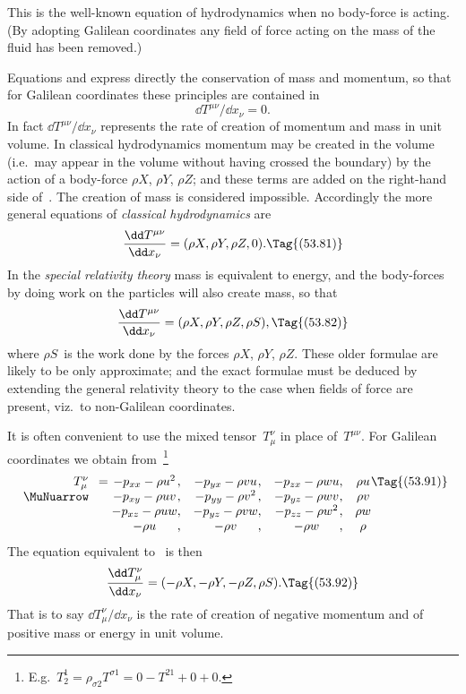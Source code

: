 \documentclass[12pt]{book}
\begin{document}
This is the well-known equation of hydrodynamics when no body\hyp{}force is
%
acting. (By adopting Galilean coordinates any field of force acting on the
mass of the fluid has been removed.)

Equations  and  express directly the conservation of mass
and momentum, so that for Galilean coordinates these principles are contained
%
in
\[
\dd T^{\mu\nu}/\dd x_{\nu} = 0.
\]
In fact $\dd T^{\mu\nu}/\dd x_{\nu}$ represents the rate of creation of momentum and mass in
unit volume. In classical hydrodynamics momentum may be created in the
volume (i.e.\ may appear in the volume without having crossed the boundary)
by the action of a body\hyp{}force $\rho X$, $\rho Y$, $\rho Z$; and these terms are added on the
right-hand side of~. The creation of mass is considered impossible.
Accordingly the more general equations of \emph{classical hydrodynamics} are
\[
\frac{\dd T^{\mu\nu}}{\dd x_{\nu}} = (\rho X, \rho Y, \rho Z, 0).
\Tag{(53.81)}
\]
In the \emph{special relativity theory} mass is equivalent to energy, and the body\hyp{}forces
by doing work on the particles will also create mass, so that
\[
\frac{\dd T^{\mu\nu}}{\dd x_{\nu}} = (\rho X, \rho Y, \rho Z, \rho S),
\Tag{(53.82)}
\]
where $\rho S$~is the work done by the forces $\rho X$, $\rho Y$, $\rho Z$. These older formulae
are likely to be only approximate; and the exact formulae must be deduced
by extending the general relativity theory to the case when fields of force are
present, viz.\ to non\hyp{}Galilean coordinates.

It is often convenient to use the mixed tensor~$T_{\mu}^{\nu}$ in place of~$T^{\mu\nu}$. For
Galilean coordinates we obtain from~\footnote
  {E.g.\ $T_{2}^{1} = \rho_{\sigma 2} T^{\sigma 1} = 0 - T^{21} + 0 + 0$.}
\[
\begin{array}[t]{r}
  T_{\mu}^{\nu} \\
  \MuNuarrow
\end{array}
=
\begin{array}[t]{@{}c@{,\quad}c@{,\quad}c@{,\quad}c@{}}
  -p_{xx} - \rho u^2 & -p_{yx} - \rho v u & -p_{zx} - \rho w u & \rho u\\
  -p_{xy} - \rho u v & -p_{yy} - \rho v^2 & -p_{yz} - \rho w v & \rho v\\
  -p_{xz} - \rho u w & -p_{yz} - \rho v w & -p_{zz} - \rho w^{2} & \rho w\\
  -\rho u & -\rho v & -\rho w & \rho\\
\end{array}
\Tag{(53.91)}
\]
The equation equivalent to~ is then
\[
\frac{\dd T_{\mu}^{\nu}}{\dd x_{\nu}} = (-\rho X,-\rho Y,-\rho Z, \rho S).
\Tag{(53.92)}
\]
That is to say $\dd T_{\mu}^{\nu}/\dd x_{\nu}$ is the rate of creation of negative momentum and of
positive mass or energy in unit volume.
\end{document}
